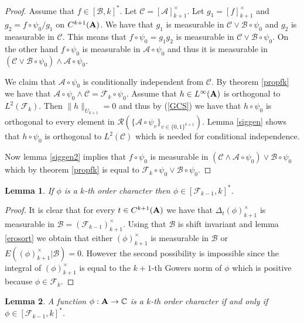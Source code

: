 \documentclass [11pt] {article}
\newtheorem{lemma}{Lemma}[section]
\def\bA{{\bf A}}
\begin{document}
\begin{proof} Assume that $f\in[\mathcal{B},k]^*$. Let $\mathcal{C}=[\mathcal{A}]_{k+1}^\times$.
Let $g_1=[f]_{k+1}^\times$ and $g_2=f\circ\psi_0/g_1$ on $C^{k+1}(\bA)$.
We have that $g_1$ is measurable in $\mathcal{C}\vee\mathcal{B}\circ\psi_0$ and $g_2$ is measurable in $\mathcal{C}$. This means that $f\circ\psi_0=g_1g_2$ is measurable in $\mathcal{C}\vee\mathcal{B}\circ\psi_0$. On the other hand $f\circ\psi_0$ is measurable in $\mathcal{A}\circ\psi_0$ and thus it is measurable in
$(\mathcal{C}\vee\mathcal{B}\circ\psi_0)\wedge\mathcal{A}\circ\psi_0.$

We claim that $\mathcal{A}\circ\psi_0$ is conditionally independent from $\mathcal{C}$. By theorem \ref{propfk} we have that $\mathcal{A}\circ\psi_0\wedge\mathcal{C}=\mathcal{F}_k\circ\psi_0$. Assume that $h\in L^\infty(\bA)$ is orthogonal to $L^2(\mathcal{F}_k)$. Then $\|h\|_{U_{k+1}}=0$ and thus by (\ref{GCS}) we have that $h\circ\psi_0$ is orthogonal to every element in $\mathcal{R}(\{\mathcal{A}\circ\psi_v\}_{v\in\{0,1\}^{k+1}})$. Lemma \ref{siggen} shows that $h\circ\psi_0$ is orthogonal to $L^2(\mathcal{C})$ which is needed for conditional independence.

Now lemma \ref{siggen2} implies that $f\circ\psi_0$ is measurable in
$(\mathcal{C}\wedge\mathcal{A}\circ\psi_0)\vee\mathcal{B}\circ\psi_0$ which by theorem \ref{propfk} is equal to $\mathcal{F}_k\circ\psi_0\vee\mathcal{B}\circ\psi_0$.

\end{proof}


\begin{lemma}\label{charsep} If $\phi$ is a $k$-th order character then $\phi\in[\mathcal{F}_{k-1},k]^*$.
\end{lemma}

\begin{proof} It is clear that for every $t\in C^{k+1}(\bA)$ we have that $\Delta_t (\phi)_{k+1}^\times$ is measurable in $\mathcal{B}=(\mathcal{F}_{k-1})_{k+1}^\times$. Using that $\mathcal{B}$ is shift invariant and lemma \ref{erosort} we obtain that either $(\phi)_{k+1}^\times$ is measurable in $\mathcal{B}$ or $E((\phi)_{k+1}^\times|\mathcal{B})=0$.
However the second possibility is impossible since the integral of $(\phi)_{k+1}^\times$ is equal to the $k+1$-th Gowers norm of $\phi$ which is positive because $\phi\in\mathcal{F}_k$.
\end{proof}

\begin{lemma}\label{charchar} A function $\phi:\bA\rightarrow\mathbb{C}$ is a $k$-th order character if and only if $\phi\in[\mathcal{F}_{k-1},k]^*$. 
\end{lemma}
\end{document}
